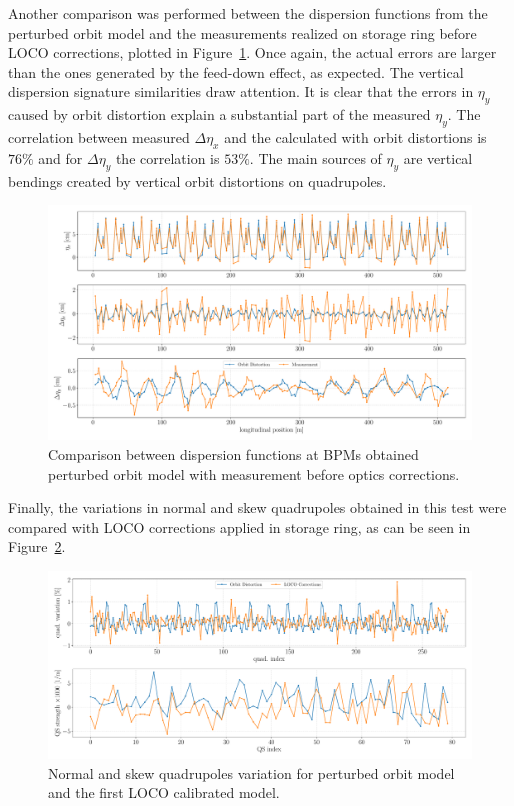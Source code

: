 Another comparison was performed between the dispersion functions from the perturbed orbit model and the measurements realized on storage ring before LOCO corrections, plotted in Figure~\ref{fig:disperson_orb}. Once again, the actual errors are larger than the ones generated by the feed-down effect, as expected. The vertical dispersion signature similarities draw attention. It is clear that the errors in $\eta_y$ caused by orbit distortion explain a substantial part of the measured $\eta_y$. The correlation between measured $\Delta\eta_x$ and the calculated with orbit distortions is $76\%$ and for $\Delta\eta_y$ the correlation is $53\%$. The main sources of $\eta_y$ are vertical bendings created by vertical orbit distortions on quadrupoles.
\begin{figure}
\centering
\includegraphics[width=1.0\textwidth]{figures/dispersion_orbit_iter0.pdf}
\caption{Comparison between dispersion functions at BPMs obtained perturbed orbit model with measurement before optics corrections.}
\label{fig:disperson_orb}
\end{figure}

Finally, the variations in normal and skew quadrupoles obtained in this test were compared with LOCO corrections applied in storage ring, as can be seen in Figure~\ref{fig:corrections_orb}.
\begin{figure}
\centering
\includegraphics[width=1.0\textwidth]{figures/corrections_orb_residue_loco_iter0.pdf}
\caption{Normal and skew quadrupoles variation for perturbed orbit model and the first LOCO calibrated model.}
\label{fig:corrections_orb}
\end{figure}

